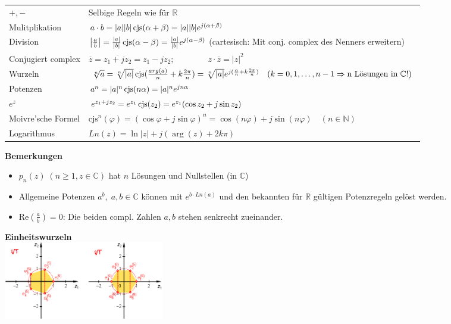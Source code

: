 \begin{tabular}{ll}
$+, -$
&Selbige Regeln wie für $\mathbb{R}$\\

Mulitplikation
&$a \cdot b = 
|a| |b| \operatorname{cjs}(\alpha + \beta) = 
|a| |b| e^{j(\alpha + \beta)}$\\

Division
&$\left|\frac{a}{b}\right| = 
\frac{\left|a\right|}{\left|b\right|} \operatorname{cjs}(\alpha - \beta) =
\frac{\left|a\right|}{\left|b\right|} e^{j(\alpha - \beta)}$ (cartesisch: Mit
conj. complex des Nenners erweitern) \\

Conjugiert complex
&$\overline{z} = \overline{z_1 + jz_2} = z_1 - jz_2; \qquad \qquad z \cdot \overline{z} = |z|^2$\\

Wurzeln
&$\sqrt[n]{a} = \sqrt[n]{|a|} \operatorname{cjs}(\frac{arg(a)}{n}+k\frac{2\pi}{n}) = 
\sqrt[n]{|a|} e^{j(\frac{\alpha}{n} + k \frac{2\pi}{n})} \quad (k = 0, 1,
\ldots, n-1 \Rightarrow \text{n Lösungen in } \mathbb{C} !)$ \\

Potenzen
&$a^n = |a|^n \operatorname{cjs}(n\alpha) = 
|a|^n e^{jn\alpha}$\\

$e^z$ &$e^{z_1+jz_2} = e^{z_1} \operatorname{cjs}(z_2) = e^{z_1} (\cos{z_2} + j\sin{z_2})$\\

Moivre'sche Formel
&$\text{cjs}^n(\varphi) =
(\cos{\varphi} + j\sin{\varphi})^n = 
\cos(n\varphi) +j\sin(n\varphi) \quad (n \in \mathbb{N})$\\

Logarithmus
&$Ln(z) = \ln{|z|} + j (\arg(z) + 2k \pi)$
\end{tabular}

\begin{minipage}[t]{11.4cm}
  \textbf{Bemerkungen}\\
  \begin{itemize}
    \item $p_n(z) \; (n \geq 1, z \in \mathbb{C})$ hat $n$ Lösungen und Nullstellen (in
  $\mathbb{C}$)  
    \item Allgemeine Potenzen $a^b,\;a,b \in \mathbb{C}$ können mit $e^{b \cdot 
    Ln(a)}$ und den bekannten für $\mathbb{R}$ gültigen Potenzregeln gelöst
    werden.
    \item Re$\left (\frac{a}{b} \right) = 0$: Die beiden compl. Zahlen $a, b$
    stehen senkrecht zueinander.
  \end{itemize}
\end{minipage}
\begin{minipage}[t]{7.4cm}
  \textbf{Einheitswurzeln}\\
  \includegraphics[width=7cm]{./bilder/einheitswurzel.png}
\end{minipage}

